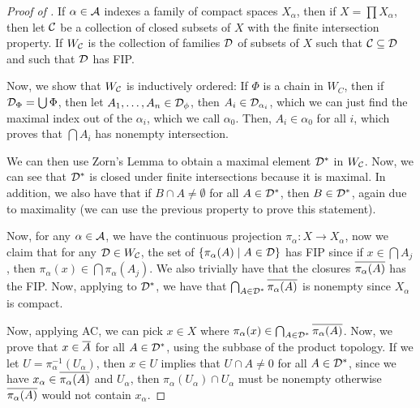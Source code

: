 \begin{proof}[Proof of ]
    If $\alpha \in \mathcal A$ indexes a family of compact spaces $X_\alpha$, then if $X = \prod X_\alpha$, then let $\mathcal C$ be a collection of closed subsets of $X$ with the finite intersection property. If $W_{\mathcal C}$ is the collection of families $\mathcal D$ of subsets of $X$ such that $\mathcal C \subseteq \mathcal D$ and such that $\mathcal D$ has FIP.

    Now, we show that $W_{\mathcal C}$ is inductively ordered: If $\Phi$ is a chain in $W_C$, then if $ \mathcal D_\Phi = \bigcup \Phi$, then let $A_1, \dots, A_n \in \mathcal D_\phi$, then $A_i \in \mathcal D_{\alpha_i}$, which we can just find the maximal index out of the $\alpha_i$, which we call $\alpha_0$. Then, $A_i \in \alpha_0$ for all $i$, which proves that $\bigcap A_i$ has nonempty intersection.

    We can then use Zorn's Lemma to obtain a maximal element $\mathcal D^*$ in $W_{\mathcal C}$. Now, we can see that $\mathcal D^*$ is closed under finite intersections because it is maximal. In addition, we also have that if $B \cap A \ne \emptyset$ for all $A \in \mathcal D^*$, then $B \in \mathcal D^*$, again due to maximality (we can use the previous property to prove this statement).

    Now, for any $\alpha \in \mathcal A$, we have the continuous projection $\pi_\alpha\colon X \to X_\alpha$, now we claim that for any $\mathcal D \in W_{\mathcal C}$, the set of $\qty{\pi_\alpha(A) \mid A \in \mathcal D}$ has FIP since if $x \in \bigcap A_j$, then $\pi_\alpha(x) \in \bigcap \pi_\alpha(A_j)$. We also trivially have that the closures $\overline{\pi_\alpha(A)}$ has the FIP. Now, applying to $\mathcal D^*$, we have that $\bigcap_{A \in \mathcal D^*} \overline{\pi_\alpha(A)}$ is nonempty since $X_\alpha$ is compact.

    Now, applying AC, we can pick $x \in X$ where $\pi_\alpha(x) \in \bigcap_{A \in \mathcal D^*} \overline{\pi_\alpha(A)}$. Now, we prove that $x \in \overline A$ for all $A \in \mathcal D^*$, using the subbase of the product topology. If we let $U = \pi_\alpha^{-1}(U_\alpha)$, then $x \in U$ implies that $U \cap A \ne 0$ for all $A \in \mathcal D^*$, since we have $x_\alpha \in \overline{\pi_\alpha(A)}$ and $U_\alpha$, then $\pi_\alpha(U_\alpha) \cap U_\alpha$ must be nonempty otherwise $\overline{\pi_\alpha(A)}$ would not contain $x_\alpha$.
\end{proof}
